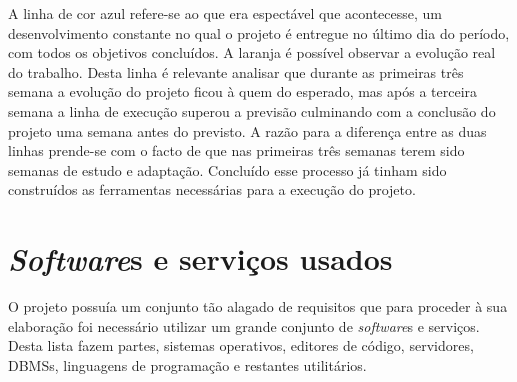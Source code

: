 \noindent
A linha de cor azul refere-se ao que era espectável que acontecesse, um desenvolvimento constante no qual o projeto é entregue no último dia do período, com todos os objetivos concluídos. A laranja é possível observar a evolução real do trabalho. Desta linha é relevante analisar que durante as primeiras três semana a evolução do projeto ficou à quem do esperado, mas após a terceira semana a linha de execução superou a previsão culminando com a conclusão do projeto uma semana antes do previsto. A razão para a diferença entre as duas linhas prende-se com o facto de que nas primeiras três semanas terem sido semanas de estudo e adaptação. Concluído esse processo já tinham sido construídos as ferramentas necessárias para a execução do projeto.

\section{\textit{Software}s e serviços usados}
O projeto possuía um conjunto tão alagado de requisitos que para proceder à sua elaboração foi necessário utilizar um grande conjunto de \textit{software}s e serviços. Desta lista fazem partes, sistemas operativos, editores de código, servidores, DBMSs, linguagens de programação e restantes utilitários.

